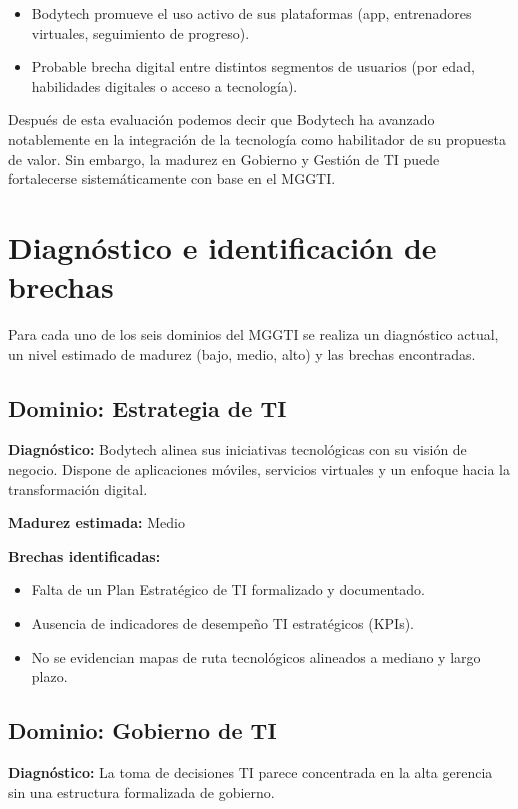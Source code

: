 \begin{itemize}
  \item Bodytech promueve el uso activo de sus plataformas (app, entrenadores virtuales, seguimiento de progreso).
  \item Probable brecha digital entre distintos segmentos de usuarios (por edad, habilidades digitales o acceso a tecnología).
\end{itemize}


Después de esta evaluación podemos decir que Bodytech ha avanzado notablemente en la integración de la tecnología como habilitador de su propuesta de valor. Sin embargo, la madurez en Gobierno y Gestión de TI puede fortalecerse sistemáticamente con base en el MGGTI.

\section{Diagnóstico e identificación de brechas}

Para cada uno de los seis dominios del MGGTI se realiza un diagnóstico actual, un nivel estimado de madurez (bajo, medio, alto) y las brechas encontradas.

\subsection{Dominio: Estrategia de TI}

\textbf{Diagnóstico:} Bodytech alinea sus iniciativas tecnológicas con su visión de negocio. Dispone de aplicaciones móviles, servicios virtuales y un enfoque hacia la transformación digital.

\textbf{Madurez estimada:} Medio

\textbf{Brechas identificadas:}
\begin{itemize}
  \item Falta de un Plan Estratégico de TI formalizado y documentado.
  \item Ausencia de indicadores de desempeño TI estratégicos (KPIs).
  \item No se evidencian mapas de ruta tecnológicos alineados a mediano y largo plazo.
\end{itemize}

\subsection{Dominio: Gobierno de TI}

\textbf{Diagnóstico:} La toma de decisiones TI parece concentrada en la alta gerencia sin una estructura formalizada de gobierno.

